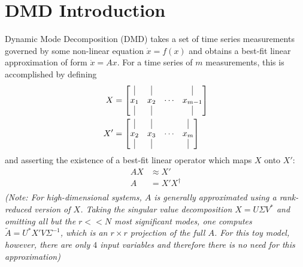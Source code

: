 \documentclass[11pt]{article} %
\begin{document}
\section{DMD Introduction}

Dynamic Mode Decomposition (DMD) takes a set of time series measurements governed by some non-linear equation $\dot{x} = f(x)$ and obtains a best-fit linear approximation of form $\dot{x} = Ax$. For a time series of $m$ measurements, this is accomplished by defining 
\begin{equation}
\begin{split}
X &= \left[\begin{matrix}
\vline & \vline & & \vline\\
x_1 & x_2 & \cdots & x_{m-1}\\
\vline & \vline & & \vline\\
\end{matrix}\right]\\
X' &= \left[\begin{matrix}
\vline & \vline & & \vline\\
x_2 & x_3 & \cdots & x_m\\
\vline & \vline & & \vline\\
\end{matrix}\right]\\
\end{split}
\end{equation}
and asserting the existence of a best-fit linear operator which maps $X$ onto $X'$:
\begin{equation}
\begin{split}
AX &\approx X'\\
A &= X'X^\dagger\\
\end{split}
\end{equation}
\textit{
(Note: For high-dimensional systems, $A$ is generally approximated using a rank-reduced version of $X$. Taking the singular value decomposition $X = U\Sigma V^*$ and omitting all but the $r << N$ most significant modes, one computes $\tilde{A} = U^* X' V \Sigma^{-1}$, which is an $r\times r$ projection of the full $A$. For this toy model, however, there are only $4$ input variables and therefore there is no need for this approximation)}\\
\end{document}
